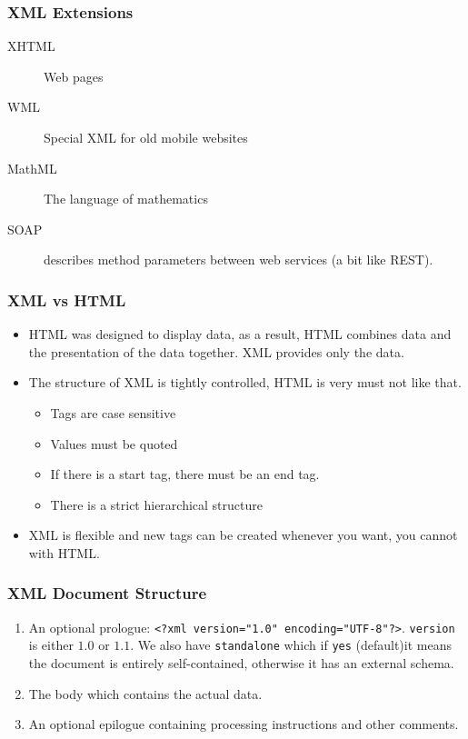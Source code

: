 \subsubsection{XML Extensions}\label{ssub:xml_extensions}

\begin{description}
    \item[XHTML] Web pages
    \item[WML] Special XML for old mobile websites
    \item[MathML] The language of mathematics
    \item[SOAP] describes method parameters between web services (a bit like REST).
\end{description}

\subsubsection{XML vs HTML}\label{ssub:xml_vs_html}

\begin{itemize}
    \item HTML was designed to display data, as a result, HTML combines data and the presentation of the data together. XML provides only the data.
    \item The structure of XML is tightly controlled, HTML is very must not like that.
          \begin{itemize}
              \item Tags are case sensitive
              \item Values must be quoted
              \item If there is a start tag, there must be an end tag.
              \item There is a strict hierarchical structure
          \end{itemize}
    \item XML is flexible and new tags can be created whenever you want, you cannot with HTML.
\end{itemize}

\subsubsection{XML Document Structure}\label{ssub:xml_document_structure}

\begin{enumerate}
    \item An optional prologue: \texttt{<?xml version="1.0" encoding="UTF-8"?>}.
          \texttt{version} is either \(1.0\) or \(1.1\).
          We also have \texttt{standalone} which if \texttt{yes} (default)it means the document is entirely self-contained, otherwise it has an external schema.
    \item The body which contains the actual data.
    \item An optional epilogue containing processing instructions and other comments.
\end{enumerate}


